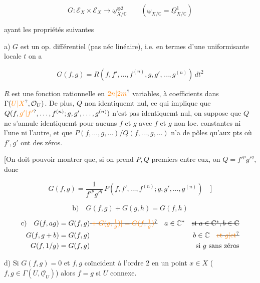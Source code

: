 \[
G:\mathcal E_X\times\mathcal E_X\longrightarrow\underline\omega_{X/\mathbb C}^{\otimes2}
\qquad(\underline\omega_{X/\mathbb C}=\underline\Omega^1_{X/\mathbb C})
\]

ayant les propriétés suivantes

a) $G$ est un op. différentiel (pas néc linéaire), i.e. en termes d'une uniformisante locale $t$  on a

\[
G(f,g)=R(f,f',\ldots,f^{(n)},g,g',\ldots,g^{(n)})\,dt^2
\]

$R$ est une fonction rationnelle en $\unsure{2n|2m}$ variables, à coefficients dans $\Gamma(\unsure{U|X},\mathcal O_U)$. De plus,   $Q$ non identiquemt nul,  ce qui implique  que $Q(f,\unsure{g'|f'},\ldots,f^{(n)};g,g',\ldots,g^{(n)})$ n'est pas identiquemt nul,   on suppose que $Q$ ne s'annule identiquemt pour aucuns $f$ et $g$ avec $f$ et $g$ non loc. constantes ni l'une ni l'autre, et que $P(f,\ldots,g,\ldots)/Q(f,\ldots,g,\ldots)$ n'a  de pôles qu'aux pts où $f',g'$ ont des zéros.

[On doit pouvoir montrer que, si on prend $P,Q$ premiers entre eux, on   $Q={f'}^{p}{g'}^{q}$, donc

\[
G(f,g)=\frac{1}{{f'}^{p}{g'}^{q}}\,P(f,f',\ldots,f^{(n)};g,g',\ldots,g^{(n)})\quad]
\]

\[
\text{b)}\quad G(f,g)+G(g,h)=G(f,h)
\]

\[
\begin{aligned}
\text{c)}\quad G(f,ag)&=G(f,g)\deleted{\unsure{{}+G(g,\tfrac1g)|{}=G(f,\tfrac1g)}}&
 a\in\mathbb C^*\quad\deleted{\text{si }a\in\mathbb C^*,b\in\mathbb C}\\
G(f,g+b)&=G(f,g)& b\in\mathbb C\quad\deleted{\unsure{\text{et }g|\text{et}}}\\
G(f,1/g)&=G(f,g)&\text{si $g$ sans zéros}
\end{aligned}
\]

d)  Si $G(f,g)=0$ et $f,g$ coïncident à l'ordre 2 en un point $x\in X$ ( $f,g\in\Gamma(U,\underline{\mathcal O}_U)$) alors $f=g$ si $U$ connexe.



